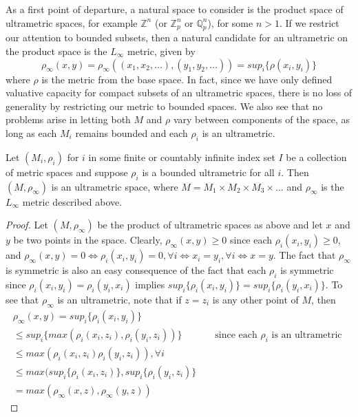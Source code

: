 As a first point of departure, a natural space to consider is the product space of ultrametric spaces, for example $\mathbb{Z}^n$ (or $\mathbb{Z}_p^n$ or $\mathbb{Q}_p^n$), for some $n >1$. If we restrict our attention to bounded subsets, then a natural candidate for an ultrametric on the product space is the $L_\infty$ metric, given by
\[ \rho_\infty(x,y) = \rho_\infty((x_1,x_2,\ldots),(y_1,y_2, \ldots)) = sup_{i} \{\rho(x_i, y_i)\}\] where $\rho$ is the metric from the base space. In fact, since we have only defined valuative capacity for compact subsets of an ultrametric spaces, there is no loss of generality by restricting our metric to bounded spaces.  We also see that no problems arise in letting both $M$ and $\rho$ vary between components of the space, as long as each $M_i$ remains bounded and each $\rho_i$ is an ultrametric. 

\begin{proposition*}
Let $(M_i, \rho_i)$ for $i$ in some finite or countably infinite index set $I$ be a collection of metric spaces and suppose $\rho_i$ is a bounded ultrametric for all $i$. Then $(M,\rho_\infty)$ is an ultrametric space, where $M=M_1 \times M_2 \times M_3 \times \ldots$ and $\rho_\infty$ is the  $L_\infty$ metric described above.
\end{proposition*}

\begin{proof}
Let $(M, \rho_\infty)$ be the product of ultrametric spaces as above and let $x$ and $y$ be two points in the space. Clearly, $\rho_\infty(x,y) \geq 0$ since each $\rho_i(x_i,y_i) \geq 0$, and $\rho_\infty(x,y) = 0 \iff \rho_i(x_i,y_i) =0,\forall i \iff x_i=y_i, \forall i \iff x=y$. The fact that $\rho_\infty$ is symmetric is also an easy consequence of the fact that each $\rho_i$ is symmetric since  $\rho_i(x_i, y_i) = \rho_i(y_i, x_i)$ implies $sup_{i}\{\rho_i(x_i, y_i)\} = sup_{i}\{\rho_i(y_i, x_i)\}$. To see that $\rho_\infty$ is an ultrametric, note that if $z=z_i$ is any other point of $M$, then
\begin{align*}
    \rho_\infty(x, y) = sup_i\{\rho_i(x_i,y_i)\} && \\
    \leq  sup_i\{max(\rho_i(x_i,z_i),\rho_i(y_i,z_i))\} && \text{ since each $\rho_i$ is an ultrametric } \\
    \leq max(\rho_i(x_i,z_i)\rho_i(y_i,z_i)), \forall i && \\
    \leq max(sup_i\{\rho_i(x_i,z_i)\}, sup_i\{\rho_i(y_i,z_i)\} && \\
    = max(\rho_\infty(x,z),\rho_\infty(y,z))  
\end{align*}

\end{proof}

